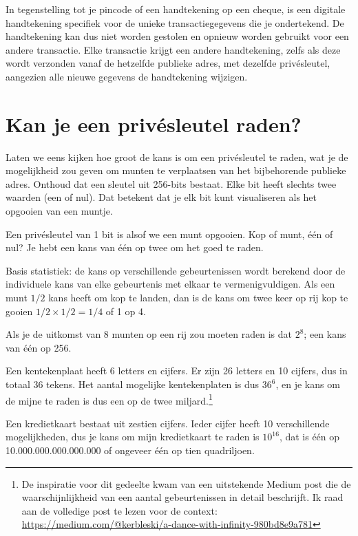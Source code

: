 In tegenstelling tot je pincode of een handtekening op een cheque, is een digitale handtekening specifiek voor de unieke transactiegegevens die je ondertekend. De handtekening kan dus niet worden gestolen en opnieuw worden gebruikt voor een andere transactie. Elke transactie krijgt een andere handtekening, zelfs als deze wordt verzonden vanaf de hetzelfde publieke adres, met dezelfde privésleutel, aangezien alle nieuwe gegevens de handtekening wijzigen.


\section[Kan je een privésleutel raden?]{Kan je een privésleutel raden?}

Laten we eens kijken hoe groot de kans is om een privésleutel te raden, wat je de mogelijkheid zou geven om munten te verplaatsen van het bijbehorende publieke adres. Onthoud dat een sleutel uit 256-bits bestaat. Elke bit heeft slechts twee waarden (een of nul). Dat betekent dat je elk bit kunt visualiseren als het opgooien van een muntje.

Een privésleutel van 1 bit is alsof we een munt opgooien. Kop of munt, één of nul? Je hebt een kans van één op twee om het goed te raden.

Basis statistiek: de kans op verschillende gebeurtenissen wordt berekend door de individuele kans van elke gebeurtenis met elkaar te vermenigvuldigen. Als een munt $1/2$ kans heeft om kop te landen, dan is de kans om twee keer op rij kop te gooien $1/2 \times 1/2 = 1/4$ of 1 op 4.

Als je de uitkomst van 8 munten op een rij zou moeten raden is dat $2^{8}$; een kans van één op 256.

Een kentekenplaat heeft 6 letters en cijfers. Er zijn 26 letters en 10 cijfers, dus in totaal 36 tekens. Het aantal mogelijke kentekenplaten is dus $36^{6}$, en je kans om de mijne te raden is dus een op de twee miljard.\footnote{De inspiratie voor dit gedeelte kwam van een uitstekende Medium post die de waarschijnlijkheid van een aantal gebeurtenissen in detail beschrijft. Ik raad aan de volledige post te lezen voor de context: \href{https://medium.com/@kerbleski/a-dance-with-infinity-980bd8e9a781}{https://medium.com/@kerbleski/a-dance-with-infinity-980bd8e9a781}}

Een kredietkaart bestaat uit zestien cijfers. Ieder cijfer heeft 10 verschillende mogelijkheden, dus je kans om mijn kredietkaart te raden is $10^{16}$, dat is één op 10.000.000.000.000.000 of ongeveer één op tien quadriljoen.

